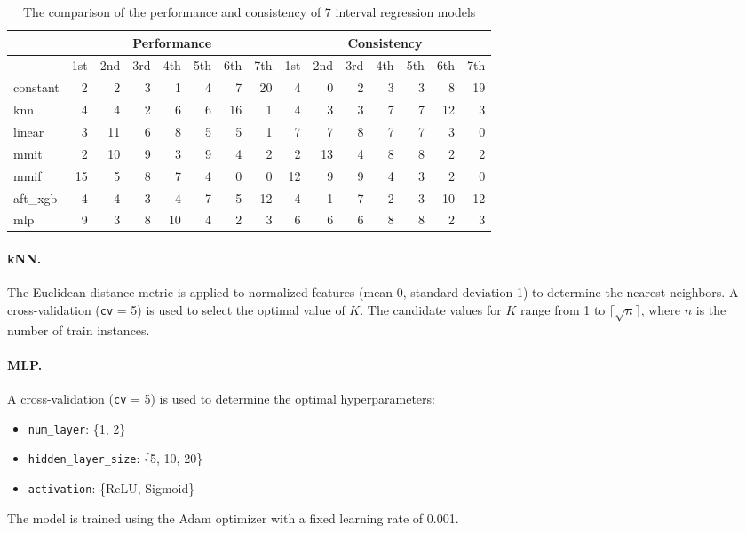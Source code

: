 \documentclass[12pt]{article}
\begin{document}
\begin{table}[t!]
\centering
\begin{tabular}{l|rrrrrrr|rrrrrrr}
\toprule
 & \multicolumn{7}{c|}{Performance} & \multicolumn{7}{c}{Consistency} \\
\midrule
 & 1st & 2nd & 3rd & 4th & 5th & 6th & 7th & 1st & 2nd & 3rd & 4th & 5th & 6th & 7th \\
\midrule
constant & 2 & 2 & 3 & 1 & 4 & 7 & 20 & 4 & 0 & 2 & 3 & 3 & 8 & 19 \\
knn & 4 & 4 & 2 & 6 & 6 & 16 & 1 & 4 & 3 & 3 & 7 & 7 & 12 & 3 \\
linear & 3 & 11 & 6 & 8 & 5 & 5 & 1 & 7 & 7 & 8 & 7 & 7 & 3 & 0 \\
mmit & 2 & 10 & 9 & 3 & 9 & 4 & 2 & 2 & 13 & 4 & 8 & 8 & 2 & 2 \\
mmif & 15 & 5 & 8 & 7 & 4 & 0 & 0 & 12 & 9 & 9 & 4 & 3 & 2 & 0 \\
aft\_xgb & 4 & 4 & 3 & 4 & 7 & 5 & 12 & 4 & 1 & 7 & 2 & 3 & 10 & 12 \\
mlp & 9 & 3 & 8 & 10 & 4 & 2 & 3 & 6 & 6 & 6 & 8 & 8 & 2 & 3 \\
\bottomrule
\end{tabular}
\caption{The comparison of the performance and consistency of 7 interval regression models}
\label{tab:comparison}
\end{table}

\paragraph{kNN.}
The Euclidean distance metric is applied to normalized features (mean 0, standard deviation 1) to determine the nearest neighbors. 
A cross-validation (\texttt{cv} = 5) is used to select the optimal value of \( K \).
The candidate values for \( K \) range from 1 to \( \lceil\sqrt{n}\rceil \), where \( n \) is the number of train instances.  

\paragraph{MLP.} A cross-validation (\texttt{cv} = 5) is used to determine the optimal hyperparameters:  
\begin{itemize} 
    \item \texttt{num\_layer}: \{1, 2\}  
    \item \texttt{hidden\_layer\_size}: \{5, 10, 20\}  
    \item \texttt{activation}: \{ReLU, Sigmoid\}  
\end{itemize}
The model is trained using the Adam optimizer with a fixed learning rate of 0.001. 
\end{document}
